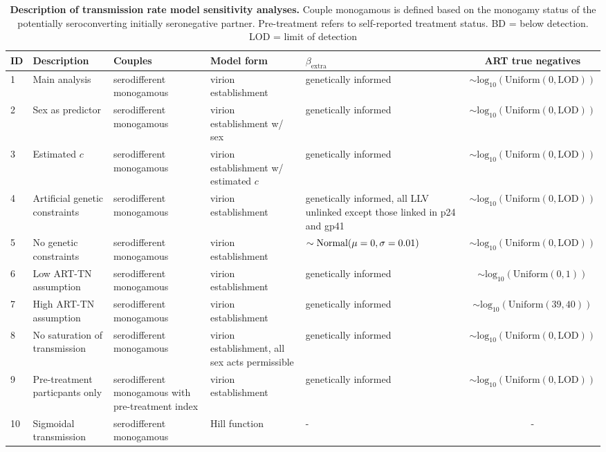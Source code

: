 \documentclass{article}[11pt]
\begin{document}
\begin{table}[!ht]
\centering
\caption{\textbf{Description of transmission rate model sensitivity analyses.} Couple monogamous is defined based on the monogamy status of the potentially seroconverting initially seronegative partner. Pre-treatment refers to self-reported treatment status. BD = below detection. LOD = limit of detection}
\begin{footnotesize}
\begin{tabular}{lL{2.5cm}L{3cm}L{2.25cm}L{2.3cm}c}
\toprule
\textbf{ID} & \textbf{Description} & \textbf{Couples} & \textbf{Model form} & \textbf{$\beta_\text{extra}$} & \textbf{ART true negatives} \\
 & Main analysis & serodifferent monogamous & virion establishment & genetically informed & $\sim\text{log}_{10}(\text{Uniform}(0,\text{LOD}))$ \\
2 & Sex as predictor & serodifferent monogamous & virion establishment w/ sex & genetically informed & $\sim\text{log}_{10}(\text{Uniform}(0,\text{LOD}))$ \\
3 & Estimated $c$ & serodifferent monogamous & virion establishment w/ estimated $c$ & genetically informed & $\sim\text{log}_{10}(\text{Uniform}(0,\text{LOD}))$ \\
4 & Artificial genetic constraints & serodifferent monogamous & virion establishment & genetically informed, all LLV unlinked except those linked in p24 and gp41  & $\sim\text{log}_{10}(\text{Uniform}(0,\text{LOD}))$ \\
5 & No genetic constraints & serodifferent monogamous & virion establishment &$\sim\text{Normal}(\newline \mu=0, \sigma=0.01)$ & $\sim\text{log}_{10}(\text{Uniform}(0,\text{LOD}))$ \\
6 & Low ART-TN assumption & serodifferent monogamous & virion establishment&genetically informed & $\sim\text{log}_{10}(\text{Uniform}(0,1))$ \\
7 & High ART-TN assumption & serodifferent monogamous & virion establishment&genetically informed & $\sim\text{log}_{10}(\text{Uniform}(39,40))$ \\
8 & No saturation of transmission & serodifferent monogamous & virion establishment, all sex acts permissible & genetically informed & $\sim\text{log}_{10}(\text{Uniform}(0,\text{LOD}))$ \\
9 & Pre-treatment particpants only & serodifferent monogamous with pre-treatment index & virion establishment & genetically informed & $\sim\text{log}_{10}(\text{Uniform}(0,\text{LOD}))$ \\
10 & Sigmoidal transmission & serodifferent monogamous & Hill function & - & - \\
\bottomrule
\end{tabular}
\end{footnotesize}
\label{table:sensitivity_analyses}
\end{table}
\end{document}
